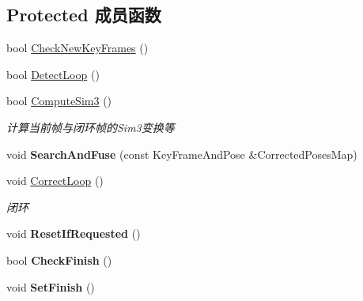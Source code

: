 \subsection*{Protected 成员函数}
\begin{DoxyCompactItemize}
\item 
bool \hyperlink{classORB__SLAM2_1_1LoopClosing_ac0c81e654509eb9384abe5e769db4f41}{Check\-New\-Key\-Frames} ()
\item 
bool \hyperlink{classORB__SLAM2_1_1LoopClosing_aa8110ca79cebaf509e378d30e55f1381}{Detect\-Loop} ()
\item 
bool \hyperlink{classORB__SLAM2_1_1LoopClosing_ab4fcf814eed5b5dd2aec96454561b078}{Compute\-Sim3} ()
\begin{DoxyCompactList}\small\item\em 计算当前帧与闭环帧的\-Sim3变换等 \end{DoxyCompactList}\item 
\hypertarget{classORB__SLAM2_1_1LoopClosing_aabe9d9b913f36b607c67b0ed0df42a1d}{void {\bfseries Search\-And\-Fuse} (const Key\-Frame\-And\-Pose \&Corrected\-Poses\-Map)}\label{classORB__SLAM2_1_1LoopClosing_aabe9d9b913f36b607c67b0ed0df42a1d}

\item 
void \hyperlink{classORB__SLAM2_1_1LoopClosing_aa007e0678582ec0de5d71280d23af540}{Correct\-Loop} ()
\begin{DoxyCompactList}\small\item\em 闭环 \end{DoxyCompactList}\item 
\hypertarget{classORB__SLAM2_1_1LoopClosing_a288545384b48c758f910a4762c873733}{void {\bfseries Reset\-If\-Requested} ()}\label{classORB__SLAM2_1_1LoopClosing_a288545384b48c758f910a4762c873733}

\item 
\hypertarget{classORB__SLAM2_1_1LoopClosing_ac13b01270b4daef9be2a098f82e9f64f}{bool {\bfseries Check\-Finish} ()}\label{classORB__SLAM2_1_1LoopClosing_ac13b01270b4daef9be2a098f82e9f64f}

\item 
\hypertarget{classORB__SLAM2_1_1LoopClosing_aeea102bfacf8538ef605d76e4192a622}{void {\bfseries Set\-Finish} ()}\label{classORB__SLAM2_1_1LoopClosing_aeea102bfacf8538ef605d76e4192a622}

\end{DoxyCompactItemize}
